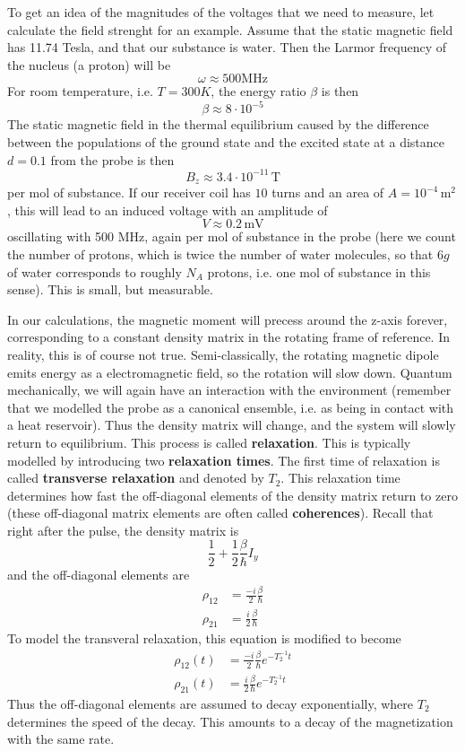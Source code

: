 \documentclass[a4paper, draft]{article}
\theoremstyle{own}
\theoremstyle{remark}
\begin{document}
To get an idea of the magnitudes of the voltages that we need to measure, let calculate the field strenght for an example. Assume that the static magnetic field has 11.74 Tesla, and that our substance is water. Then the Larmor frequency of the nucleus (a proton) will be
$$
\omega \approx 500 \text{MHz}
$$
For room temperature, i.e. $T = 300 K$, the energy ratio $\beta$ is then
$$
\beta \approx 8 \cdot 10^{-5}
$$
The static magnetic field in the thermal equilibrium caused by the difference between the populations of the ground state and the excited state at a distance $d = 0.1$ from the probe is then
$$
B_z \approx 3.4 \cdot 10^{-11} \, \text{T}
$$
per mol of substance. If our receiver coil has $10$ turns and an area of $A = 10^{-4} \, \text{m}^2 $, this will lead to an induced voltage with an amplitude of
$$
V \approx 0.2 \, \text{mV}
$$
oscillating with 500 MHz, again per mol of substance in the probe (here we count the number of protons, which is twice the number of water molecules, so that $6 g$ of water corresponds to roughly $N_A$ protons, i.e. one mol of substance in this sense). This is small, but measurable. 

In our calculations, the magnetic moment will precess around the z-axis forever, corresponding to a constant density matrix in the rotating frame of reference. In reality, this is of course not true. Semi-classically, the rotating magnetic dipole emits energy as a electromagnetic field, so the rotation will slow down. Quantum mechanically, we will again have an interaction with the environment (remember that we modelled the probe as a canonical ensemble, i.e. as being in contact with a heat reservoir). Thus the  
density matrix will change, and the system will slowly return to equilibrium. This process is called {\bf relaxation}. This is typically modelled by introducing two {\bf relaxation times}. The first time of relaxation is called {\bf transverse relaxation} and denoted by $T_2$. This relaxation time determines how fast the off-diagonal elements of the density matrix return to zero (these off-diagonal matrix elements are often called {\bf coherences}). Recall that right after the pulse, the density matrix is
$$
\frac{1}{2} + \frac{1}{2} \frac{\beta}{\hbar} I_y
$$
and the off-diagonal elements are 
\begin{align*}
\rho_{12} &= \frac{-i}{2} \frac{\beta}{\hbar} \\
\rho_{21} &= \frac{i}{2} \frac{\beta}{\hbar} 
\end{align*}
To model the transveral relaxation, this equation is modified to become
\begin{align*}
\rho_{12}(t) &= \frac{-i}{2} \frac{\beta}{\hbar} e^{- T_2^{-1} t}\\
\rho_{21}(t) &= \frac{i}{2} \frac{\beta}{\hbar} e^{- T_2^{-1} t}
\end{align*}
Thus the off-diagonal elements are assumed to decay exponentially, where $T_2$ determines the speed of the decay. This amounts to a decay of the magnetization with the same rate. 
\end{document}
